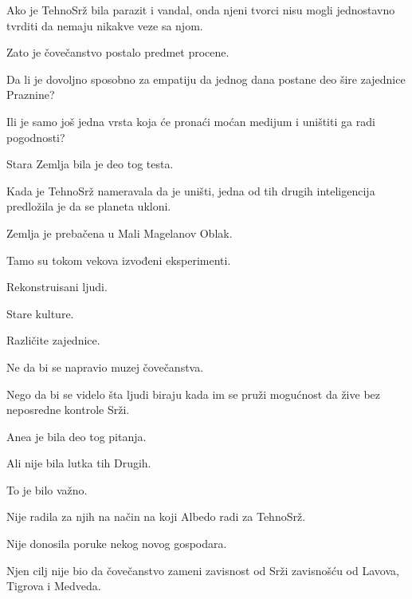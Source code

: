 \bigskip

Ako je TehnoSrž bila parazit i vandal, onda njeni tvorci nisu mogli jednostavno tvrditi da nemaju nikakve veze sa njom.

\bigskip

Zato je čovečanstvo postalo predmet procene.

\bigskip

Da li je dovoljno sposobno za empatiju da jednog dana postane deo šire zajednice Praznine?

\bigskip

Ili je samo još jedna vrsta koja će pronaći moćan medijum i uništiti ga radi pogodnosti?

\bigskip

Stara Zemlja bila je deo tog testa.

\bigskip

Kada je TehnoSrž nameravala da je uništi, jedna od tih drugih inteligencija predložila je da se planeta ukloni.

\bigskip

Zemlja je prebačena u Mali Magelanov Oblak.

\bigskip

Tamo su tokom vekova izvođeni eksperimenti.

Rekonstruisani ljudi.

Stare kulture.

Različite zajednice.

\bigskip

Ne da bi se napravio muzej čovečanstva.

\bigskip

Nego da bi se videlo šta ljudi biraju kada im se pruži mogućnost da žive bez neposredne kontrole Srži.

\bigskip

Anea je bila deo tog pitanja.

\bigskip

Ali nije bila lutka tih Drugih.

\bigskip

To je bilo važno.

\bigskip

Nije radila za njih na način na koji Albedo radi za TehnoSrž.

\bigskip

Nije donosila poruke nekog novog gospodara.

\bigskip

Njen cilj nije bio da čovečanstvo zameni zavisnost od Srži zavisnošću od Lavova, Tigrova i Medveda.

